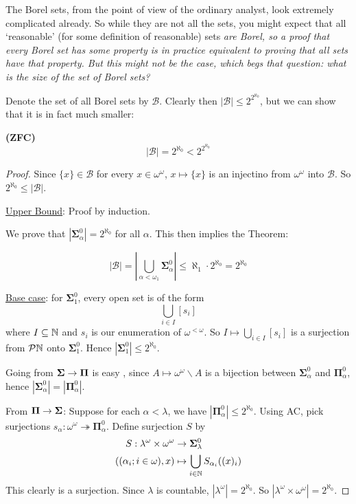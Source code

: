 \documentclass[]{article}
\newcommand{\om}{\omega}
\newcommand{\lom}{{<\omega}}
\newcommand{\bosig}{\bm{\Sigma}}
\newcommand{\bopi}{\bm{\Pi}}
\begin{document}

The Borel sets, from the point of view of the ordinary analyst, look extremely complicated already. So while they are not all the sets, you might expect that all `reasonable' (for some definition of reasonable) sets \it{are} Borel, so a proof that every Borel set has some property is in practice equivalent to proving that all sets have that property. But this might not be the case, which begs that question: what \it{is} the size of the set of Borel sets?

Denote the set of all Borel sets by $\mathcal{B}$. Clearly then $|\mathcal{B}| \le 2^{2^{\aleph_0}}$, but we can show that it is in fact much smaller:

\begin{theorem*}\textbf{(ZFC)}
    $$|\mathcal{B}| = 2^{\aleph_0} < 2^{2^{\aleph_0}}$$
\end{theorem*}
\begin{proof}
    Since $\{x\}\in \mathcal{B}$ for every $x \in \om^\om$, $x\mapsto \{x\}$ is an injectino from $\om^\om$ into $\mathcal{B}$. So $2^{\aleph_0} \le |\mathcal{B}|$.

    \underline{Upper Bound}: Proof by induction.

    We prove that $|\bosig_\alpha^0| = 2^{\aleph_0}$ for all $\alpha$. This then implies the Theorem:

    $$ |\mathcal{B}| = \left|\bigcup_{\alpha < \om_1} \bosig_{\alpha}^0 \right| \le \aleph_1 \cdot 2^{\aleph_0} = 2^{\aleph_0}$$

    \underline{Base case}: for $\bosig_{1}^{0}$, every open set is of the form $$\bigcup_{i\in I}[s_i]$$ where $I\subseteq \mathbb{N}$ and $s_i$ is our enumeration of $\om^\lom$. So $I\mapsto \bigcup_{i\in I}[s_i]$ is a surjection from $\mathcal{P}\mathbb{N}$ onto $\bosig_{1}^{0}$. Hence $|\bosig_1^0| \le 2^{\aleph_0}$.

    Going from $\bosig \ra \bopi$ is easy , since $A\mapsto \om^\om \backslash A$ is a bijection between $\bosig_\alpha^0$ and $\bopi_\alpha^0$, hence $|\bosig_\alpha^0| = |\bopi_\alpha^0|$.

    From $\bopi \ra \bosig$: Suppose for each $\alpha < \lambda$, we have $|\bopi_\alpha^0| \le 2^{\aleph_0}$. Using AC, pick surjections $s_\alpha : \om^\om \twoheadrightarrow \bopi_\alpha^0$. Define surjection $S$ by
    \begin{align*}
        S : \lambda^\om \times \om^\om &\ra \bosig_\lambda ^0 \\
        ((\alpha_i;i\in \om),x)&\mapsto \bigcup_{i\in \N}S_{\alpha_i}((x)_i)
    \end{align*}
    This clearly is a surjection. Since $\lambda$ is countable, $|\lambda^\om| = 2^{\aleph_0}$. So $|\lambda^\om \times \om^\om| = 2^{\aleph_0}$.
\end{proof}
\end{document}
